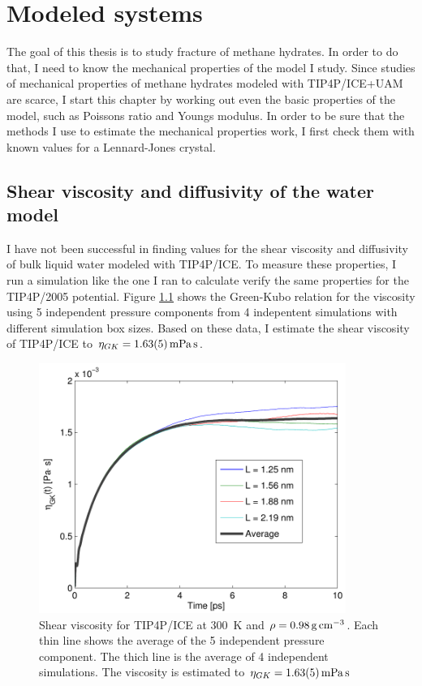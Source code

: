 
\chapter{Modeled systems}
The goal of this thesis is to study fracture of methane hydrates. In order to do that, I need to know the mechanical properties of the model I study. Since studies of mechanical properties of methane hydrates modeled with TIP4P/ICE+UAM are scarce, I start this chapter by working out even the basic properties of the model, such as Poissons ratio and Youngs modulus. In order to be sure that the methods I use to estimate the mechanical properties work, I first check them with known values for a Lennard-Jones crystal. 

\section{Shear viscosity and diffusivity of the water model}
I have not been successful in finding values for the shear viscosity and diffusivity of bulk liquid water modeled with TIP4P/ICE. To measure these properties, I run a simulation like the one I ran to calculate verify the same properties for the TIP4P/2005 potential. Figure \ref{fig:viscosity_green_kubo_tip4p_ice} shows the Green-Kubo relation for the viscosity using 5 independent pressure components from 4 indepentent simulations with different simulation box sizes. Based on these data, I estimate the shear viscosity of TIP4P/ICE to $\eta_{GK} = \text{\SI{1.63\pm 0.05}{\milli\pascal\second}}$. 

\begin{figure}
\centering
\includegraphics[width=10cm]{../figures/thesis/viscosity_green_kubo_tip4p_ice.pdf}
\caption{Shear viscosity for TIP4P/ICE at \SI{300}{\kelvin} and $\rho = \text{\SI{0.98}{\gram\per\cubic\cm}}$. Each thin line shows the average of the 5 independent pressure component. The thich line is the average of 4 independent simulations. The viscosity is estimated to $\eta_{GK} = \text{\SI{1.63\pm0.05}{\milli\pascal\second}}$}
\label{fig:viscosity_green_kubo_tip4p_ice}
\end{figure}

